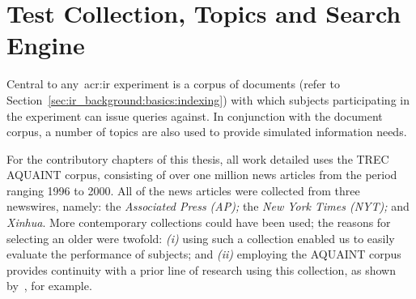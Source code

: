 %
%
%
%
%
%
%

\section{Test Collection, Topics and Search Engine}\label{sec:csm:methodology:collection}
Central to any~\gls{acr:ir} experiment is a corpus of documents (refer to Section~\ref{sec:ir_background:basics:indexing}) with which subjects participating in the experiment can issue queries against. In conjunction with the document corpus, a number of topics are also used to provide simulated information needs.

For the contributory chapters of this thesis, all work detailed uses the TREC AQUAINT corpus, consisting of over one million news articles from the period ranging 1996 to 2000. All of the news articles were collected from three newswires, namely: the \emph{Associated Press (AP);} the \emph{New York Times (NYT);} and \emph{Xinhua}. More contemporary collections could have been used; the reasons for selecting an older were twofold: \emph{(i)} using such a collection enabled us to easily evaluate the performance of subjects; and \emph{(ii)} employing the AQUAINT corpus provides continuity with a prior line of research using this collection, as shown by~\cite{azzopardi2013query_cost}, for example.

